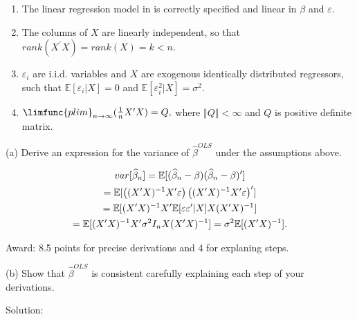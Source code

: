 \documentclass{article}
\begin{document}
\begin{enumerate}
\item The linear regression model in is correctly specified and linear in $%
\beta $ and $\varepsilon .$

\item The columns of $X$ are linearly independent, so that $rank(X^{\prime
}X)=rank(X)=k<n.$

\item $\varepsilon _{i}$ are i.i.d. variables and $X$ are exogenous
identically distributed regressors, such that $\mathbb{E}[\varepsilon
_{i}|X]=0$ and $\mathbb{E}[\varepsilon _{i}^{2}|X]=\sigma ^{2}.$

\item $\limfunc{plim}_{n\rightarrow \infty }(\frac{1}{n}X^{\prime }X)=Q,$
where $\left\Vert Q\right\Vert <\infty $ and $Q$ is positive definite matrix.
\end{enumerate}

(a) Derive an expression for the variance of $\hat{\beta}^{OLS}$ under the
assumptions above$.$

\begin{gather*}
var[\widehat{\beta }_{n}]=\mathbb{E[(}\widehat{\beta }_{n}-\beta )(\widehat{%
\beta }_{n}-\beta )^{\prime }\mathbb{]} \\
=\mathbb{E}[\left( (X^{\prime }X)^{-1}X^{\prime }\varepsilon \right) \left(
(X^{\prime }X)^{-1}X^{\prime }\varepsilon \right) ^{\prime }] \\
=\mathbb{E}[(X^{\prime }X)^{-1}X^{\prime }\mathbb{E[}\varepsilon \varepsilon
^{\prime }|X]X(X^{\prime }X)^{-1}] \\
=\mathbb{E}[(X^{\prime }X)^{-1}X^{\prime }\sigma ^{2}I_{n}X(X^{\prime
}X)^{-1}]=\sigma ^{2}\mathbb{E}[(X^{\prime }X)^{-1}].
\end{gather*}

Award: 8.5 points for precise derivations and 4 for explaning steps.

(b) Show that $\hat{\beta}^{OLS}$ is consistent carefully explaining each
step of your derivations.

\bigskip

Solution:
\end{document}
